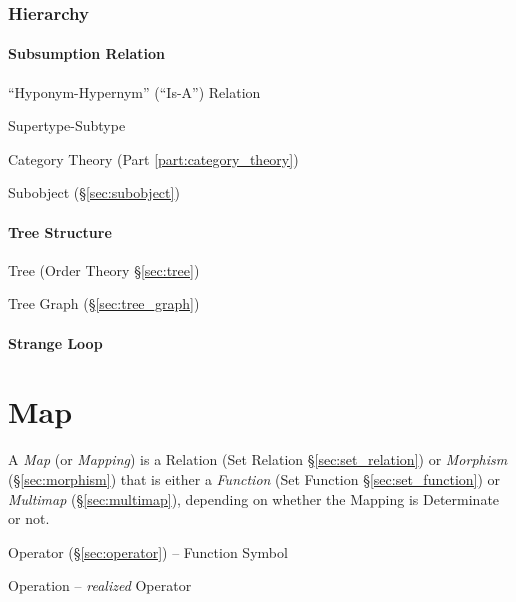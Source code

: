 \subsubsection{Hierarchy}\label{sec:hierarchy}

\paragraph{Subsumption Relation}\label{sec:subsumption_relation}\hfill

``Hyponym-Hypernym'' (``Is-A'') Relation


Supertype-Subtype

Category Theory (Part \ref{part:category_theory})

Subobject (\S\ref{sec:subobject})



\paragraph{Tree Structure}\label{sec:tree_structure}\hfill

Tree (Order Theory \S\ref{sec:tree})

Tree Graph (\S\ref{sec:tree_graph})



\paragraph{Strange Loop}\label{sec:strange_loop}\hfill



\section{Map}\label{sec:map}

A \emph{Map} (or \emph{Mapping}) is a Relation (Set Relation
\S\ref{sec:set_relation}) or \emph{Morphism} (\S\ref{sec:morphism}) that is
either a \emph{Function} (Set Function \S\ref{sec:set_function}) or
\emph{Multimap} (\S\ref{sec:multimap}), depending on whether the Mapping is
Determinate or not.

Operator (\S\ref{sec:operator}) -- Function Symbol

Operation -- \emph{realized} Operator

